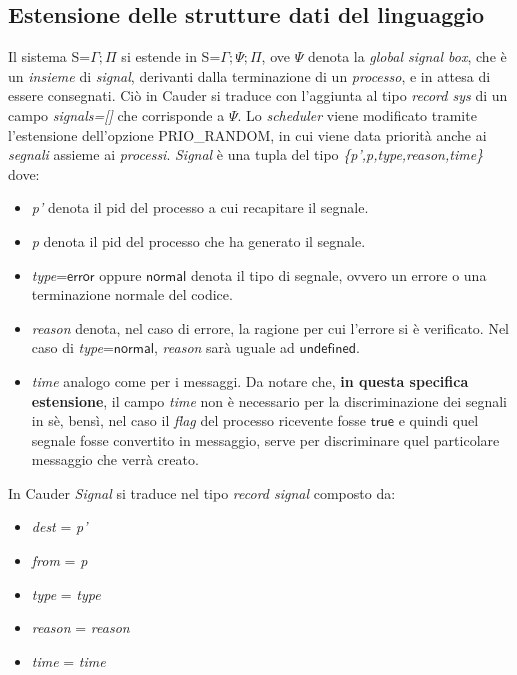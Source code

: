 \documentclass[Contributo.tex]{subfiles}
\begin{document}
\subsection{Estensione delle strutture dati del linguaggio}
Il sistema S=$\displaystyle \Gamma;\Pi$ si estende in S=$\displaystyle \Gamma;\Psi;\Pi$, ove $\Psi$ denota la \textit{global signal box}, che è un \textit{insieme} di \textit{signal}, derivanti dalla terminazione di un \textit{processo}, e in attesa di essere consegnati.
Ciò in Cauder si traduce con l'aggiunta al tipo \textit{record sys} di un campo \textit{signals=[]} che corrisponde a $\Psi$.
Lo \textit{scheduler} viene modificato tramite l'estensione dell'opzione PRIO\_RANDOM, in cui viene data priorità anche ai \textit{segnali} assieme ai \textit{processi}.
\textit{Signal} è una tupla del tipo \textit{\{p',p,type,reason,time\}} dove:
	\begin{itemize}
		\item \textit{p'} denota il pid del processo a cui recapitare il segnale.
		\item \textit{p} denota il pid del processo che ha generato il segnale.
		\item \textit{type}=$\mathsf{error}$ oppure $\mathsf{normal}$ denota il tipo di segnale, ovvero un errore o una terminazione normale del codice.
		\item \textit{reason} denota, nel caso di errore, la ragione per cui l'errore si è verificato.
			  Nel caso di \textit{type}=$\mathsf{normal}$, \textit{reason} sarà uguale ad $\mathsf{undefined}$.
		\item \textit{time} analogo come per i messaggi. Da notare che, \textbf{in questa specifica estensione}, il campo \textit{time} non è necessario per la discriminazione dei segnali in sè, bensì, nel caso il \textit{flag} del processo ricevente fosse $\mathsf{true}$ e quindi quel segnale fosse convertito in messaggio, serve per discriminare quel particolare messaggio che verrà creato.
	\end{itemize}
In Cauder \textit{Signal} si traduce nel tipo \textit{record signal} composto da:
	\begin{itemize}
		\item \textit{dest} = \textit{p'} 
		\item \textit{from} = \textit{p}
		\item \textit{type} = \textit{type}
		\item \textit{reason} = \textit{reason}
		\item \textit{time} = \textit{time}
	\end{itemize}
\end{document}
